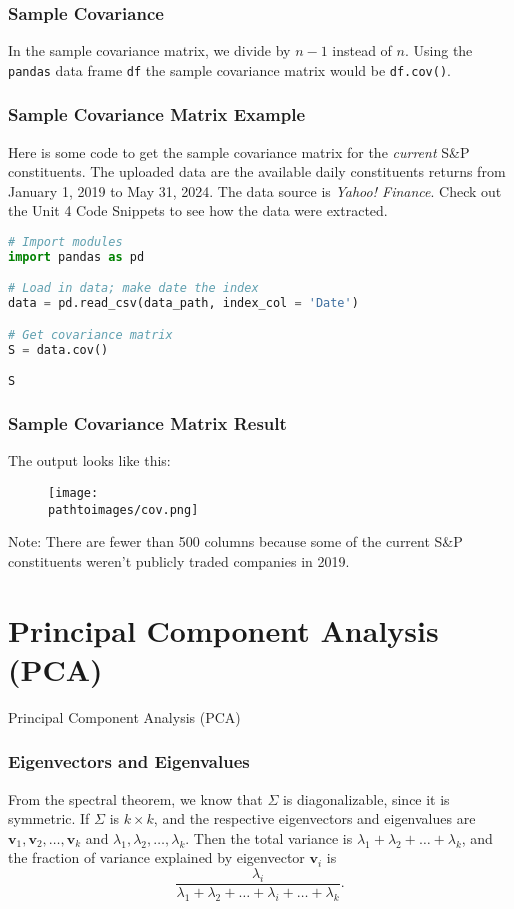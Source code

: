 \documentclass{beamer}
\newcommand{\pathtoimages}{/Users/charlesrambo/Desktop/Bootcamp24/Images}
\begin{document}
\begin{frame}
\frametitle{Sample Covariance}
In the sample covariance matrix, we divide by $n-1$ instead of $n$. Using the \texttt{pandas} data frame \texttt{df} the sample covariance matrix would be  \texttt{df.cov()}.

\end{frame}

\begin{frame}[fragile]
\frametitle{Sample Covariance Matrix Example}
\small 
Here is some code to get the sample covariance matrix for the {\it current} S\&P constituents. The uploaded data are the available daily constituents returns from January 1, 2019 to May 31, 2024. The data source is {\it Yahoo! Finance}. Check out the Unit 4 Code Snippets to see how the data were extracted.
\begin{lstlisting}[language=Python]
# Import modules
import pandas as pd

# Load in data; make date the index
data = pd.read_csv(data_path, index_col = 'Date')

# Get covariance matrix
S = data.cov()

S
\end{lstlisting}


\end{frame}

\begin{frame}
\frametitle{Sample Covariance Matrix Result}
The output looks like this:
\begin{figure}
\centering
\texttt{[image: \\pathtoimages/cov.png]}
\end{figure}
Note: There are fewer than 500 columns because some of the current S\&P constituents weren't publicly traded companies in 2019.
\end{frame}

\section{Principal Component Analysis (PCA)}


\begin{frame}
\begin{center}
\Huge Principal Component Analysis (PCA)
\end{center}
\end{frame}


\begin{frame}
\frametitle{Eigenvectors and Eigenvalues}
From the spectral theorem, we know that $\Sigma$ is diagonalizable, since it is symmetric. If $\Sigma$ is $k\times k$, and the respective eigenvectors and eigenvalues are ${\boldsymbol v_1}, {\boldsymbol v_2},\ldots, {\boldsymbol v_k}$ and $\lambda_1, \lambda_2,\ldots, \lambda_k$. Then the total variance is $\lambda_1 + \lambda_2+\ldots+\lambda_k$, and the fraction of variance explained by eigenvector ${\boldsymbol v_i}$ is
$$
\frac{\lambda_i}{\lambda_1 +\lambda_2+\ldots+\lambda_i+\ldots+\lambda_k}.
$$
\end{frame}
\end{document}
